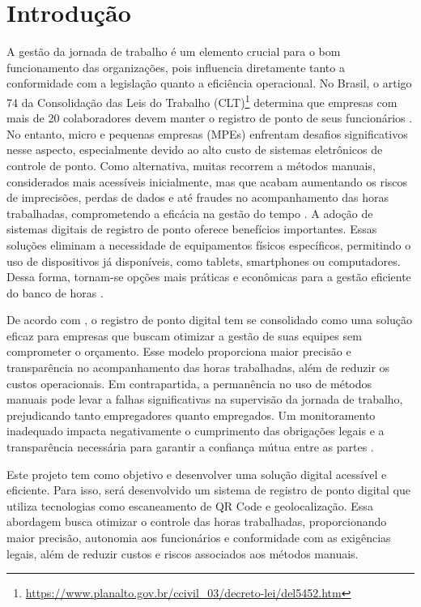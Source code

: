 \chapter{Introdução}

A gestão da jornada de trabalho é um elemento crucial para o bom funcionamento das organizações, pois influencia diretamente tanto a conformidade com a legislação quanto a eficiência operacional. No Brasil, o artigo 74 da Consolidação das Leis do Trabalho (CLT)\footnote{\url{https://www.planalto.gov.br/ccivil_03/decreto-lei/del5452.htm}} determina que empresas com mais de 20 colaboradores devem manter o registro de ponto de seus funcionários \cite{brasil1943}. No entanto, micro e pequenas empresas (MPEs) enfrentam desafios significativos nesse aspecto, especialmente devido ao alto custo de sistemas eletrônicos de controle de ponto. Como alternativa, muitas recorrem a métodos manuais, considerados mais acessíveis inicialmente, mas que acabam aumentando os riscos de imprecisões, perdas de dados e até fraudes no acompanhamento das horas trabalhadas, comprometendo a eficácia na gestão do tempo \cite{miranda2023}.
A adoção de sistemas digitais de registro de ponto oferece benefícios importantes. Essas soluções eliminam a necessidade de equipamentos físicos específicos, permitindo o uso de dispositivos já disponíveis, como tablets, smartphones ou computadores. Dessa forma, tornam-se opções mais práticas e econômicas para a gestão eficiente do banco de horas \cite{FlorindoBianchi2022}.
 
De acordo com \textcite{gomes2023}, o registro de ponto digital tem se consolidado como uma solução eficaz para empresas que buscam otimizar a gestão de suas equipes sem comprometer o orçamento. Esse modelo proporciona maior precisão e transparência no acompanhamento das horas trabalhadas, além de reduzir os custos operacionais. Em contrapartida, a permanência no uso de métodos manuais pode levar a falhas significativas na supervisão da jornada de trabalho, prejudicando tanto empregadores quanto empregados. Um monitoramento inadequado impacta negativamente o cumprimento das obrigações legais e a transparência necessária para garantir a confiança mútua entre as partes \cite{abreu2016sistema}.

Este projeto tem como objetivo e desenvolver uma solução digital acessível e eficiente. Para isso, será desenvolvido um sistema de registro de ponto digital que utiliza tecnologias como escaneamento de QR Code e geolocalização. Essa abordagem busca otimizar o controle das horas trabalhadas, proporcionando maior precisão, autonomia aos funcionários e conformidade com as exigências legais, além de reduzir custos e riscos associados aos métodos manuais. 

